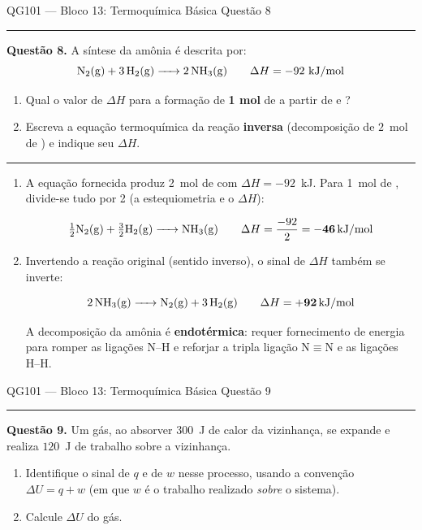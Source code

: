 \documentclass[10pt,a4paper]{article}
\newcommand{\questaoheader}[1]{%
  \begin{center}
  {\small\sffamily QG101 --- Bloco 13: Termoquímica Básica
  \hfill Questão #1}
  \end{center}
  \vspace{-0.3cm}
  \noindent\rule{\textwidth}{0.6pt}
  \vspace{0.1cm}
}
\newcommand{\resolucaosep}{%
  \vspace{0.4cm}
  \noindent\rule{\textwidth}{0.4pt}
  \vspace{0.1cm}

  \noindent{\bf Resolução:}
  \vspace{0.2cm}
}
\begin{document}
\clearpage

\questaoheader{8}

\noindent\textbf{Questão 8.}
A síntese da amônia é descrita por:
$$\ce{N2(g) + 3H2(g) -> 2NH3(g)} \qquad \Delta H = -92~\text{kJ/mol}$$
\begin{enumerate}
  \item Qual o valor de $\Delta H$ para a formação de \textbf{1 mol} de
         a partir de  e ?
  \item Escreva a equação termoquímica da reação \textbf{inversa}
        (decomposição de $2$~mol de ) e indique seu $\Delta H$.
\end{enumerate}

\resolucaosep

\begin{enumerate}
  \item A equação fornecida produz 2~mol de  com $\Delta H =
        -92$~kJ. Para 1~mol de , divide-se tudo por 2 (a
        estequiometria e o $\Delta H$):

        \[
          \tfrac{1}{2}\ce{N2(g) + \tfrac{3}{2}H2(g) -> NH3(g)}
          \qquad
          \Delta H = \frac{-92}{2} = \mathbf{-46\,\text{kJ/mol}}
        \]

  \item Invertendo a reação original (sentido inverso), o sinal de
        $\Delta H$ também se inverte:

        \[
          \ce{2NH3(g) -> N2(g) + 3H2(g)}
          \qquad
          \Delta H = \mathbf{+92\,\text{kJ/mol}}
        \]

        A decomposição da amônia é \textbf{endotérmica}: requer
        fornecimento de energia para romper as ligações N--H e reforjar
        a tripla ligação N$\equiv$N e as ligações H--H.
\end{enumerate}

\clearpage

\questaoheader{9}

\noindent\textbf{Questão 9.}
Um gás, ao absorver $300$~J de calor da vizinhança, se expande e realiza
$120$~J de trabalho sobre a vizinhança.
\begin{enumerate}
  \item Identifique o sinal de $q$ e de $w$ nesse processo, usando a
        convenção $\Delta U = q + w$ (em que $w$ é o trabalho realizado
        \emph{sobre} o sistema).
  \item Calcule $\Delta U$ do gás.
\end{enumerate}
\end{document}
